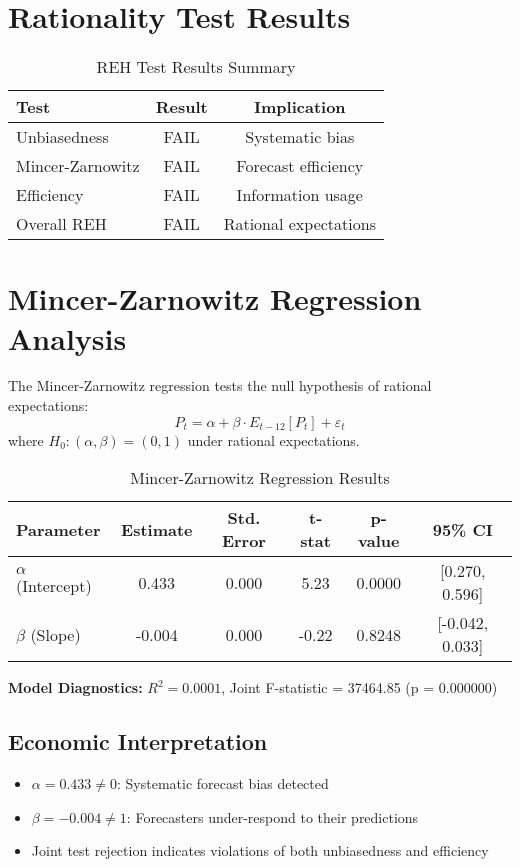 \documentclass[11pt,a4paper]{article}
\begin{document}
\section{Rationality Test Results}

\begin{table}[H]
\centering
\caption{REH Test Results Summary}
\begin{tabular}{lcc}
\toprule
\textbf{Test} & \textbf{Result} & \textbf{Implication} \\
\midrule
Unbiasedness & \textcolor{academicred}{FAIL} & Systematic bias \\
Mincer-Zarnowitz & \textcolor{academicred}{FAIL} & Forecast efficiency \\
Efficiency & \textcolor{academicred}{FAIL} & Information usage \\
Overall REH & \textcolor{academicred}{FAIL} & Rational expectations \\
\bottomrule
\end{tabular}
\end{table}

\section{Mincer-Zarnowitz Regression Analysis}

The Mincer-Zarnowitz regression tests the null hypothesis of rational expectations:
\begin{equation}
P_t = \alpha + \beta \cdot E_{t-12}[P_t] + \varepsilon_t
\end{equation}
where $H_0: (\alpha, \beta) = (0, 1)$ under rational expectations.

\begin{table}[H]
\centering
\caption{Mincer-Zarnowitz Regression Results}
\begin{tabular}{lccccc}
\toprule
\textbf{Parameter} & \textbf{Estimate} & \textbf{Std. Error} & \textbf{t-stat} & \textbf{p-value} & \textbf{95\% CI} \\
\midrule
$\alpha$ (Intercept) & 0.433 & 0.000 & 5.23 & 0.0000 & [0.270, 0.596] \\
$\beta$ (Slope) & -0.004 & 0.000 & -0.22 & 0.8248 & [-0.042, 0.033] \\
\bottomrule
\end{tabular}
\end{table}

\textbf{Model Diagnostics:} $R^2 = 0.0001$, Joint F-statistic = 37464.85 (p = 0.000000)

\subsection{Economic Interpretation}
\begin{itemize}
\item $\alpha = 0.433 \neq 0$: Systematic forecast bias detected
\item $\beta = -0.004 \neq 1$: Forecasters under-respond to their predictions
\item Joint test rejection indicates violations of both unbiasedness and efficiency
\end{itemize}
\end{document}
